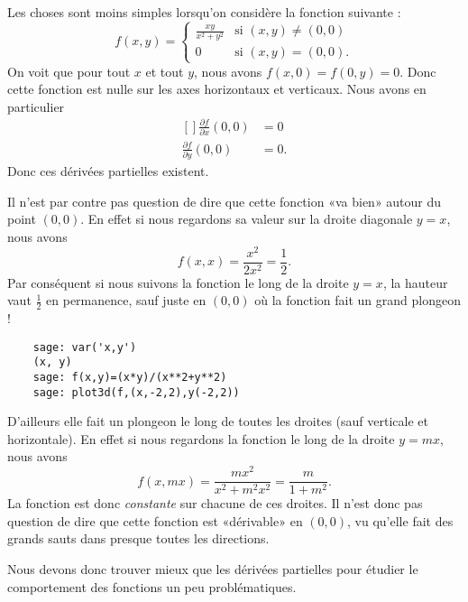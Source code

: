 \begin{example}
	Les choses sont moins simples lorsqu'on considère la fonction suivante :
	\begin{equation}
		f(x,y)=\begin{cases}
			\frac{ xy }{ x^2+y^2 } & \text{si }(x,y)\neq(0,0) \\
			0                      & \text{si }(x,y)=(0,0).
		\end{cases}
	\end{equation}
	On voit que pour tout \( x\) et tout \( y\), nous avons \( f(x,0)=f(0,y)=0\). Donc cette fonction est nulle sur les axes horizontaux et verticaux. Nous avons en particulier
	\begin{equation}
		\begin{aligned}[]
			\frac{ \partial f }{ \partial x }(0,0) & =0  \\
			\frac{ \partial f }{ \partial y }(0,0) & =0.
		\end{aligned}
	\end{equation}
	Donc ces dérivées partielles existent.

	Il n'est par contre pas question de dire que cette fonction «va bien» autour du point \( (0,0)\). En effet si nous regardons sa valeur sur la droite diagonale \( y=x\), nous avons
	\begin{equation}
		f(x,x)=\frac{ x^2 }{ 2x^2 }=\frac{ 1 }{2}.
	\end{equation}
	Par conséquent si nous suivons la fonction le long de la droite \( y=x\), la hauteur vaut \( \frac{ 1 }{2}\) en permanence, sauf juste en \( (0,0)\) où la fonction fait un grand plongeon !
	\begin{verbatim}
    sage: var('x,y')
    (x, y)
    sage: f(x,y)=(x*y)/(x**2+y**2)
    sage: plot3d(f,(x,-2,2),y(-2,2))
    \end{verbatim}

	D'ailleurs elle fait un plongeon le long de toutes les droites (sauf verticale et horizontale). En effet si nous regardons la fonction le long de la droite \( y=mx\), nous avons
	\begin{equation}
		f(x,mx)=\frac{ mx^2 }{ x^2+m^2x^2 }=\frac{ m }{ 1+m^2 }.
	\end{equation}
	La fonction est donc \emph{constante} sur chacune de ces droites. Il n'est donc pas question de dire que cette fonction est «dérivable» en \( (0,0)\), vu qu'elle fait des grands sauts dans presque toutes les directions.
\end{example}

Nous devons donc trouver mieux que les dérivées partielles pour étudier le comportement des fonctions un peu problématiques.

